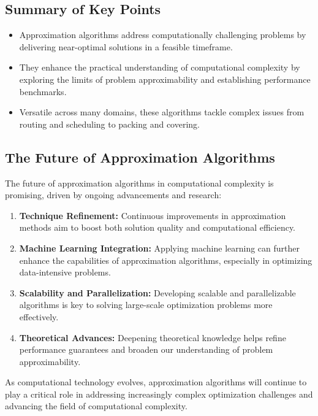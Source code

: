 \documentclass[12pt]{book} %
\begin{document}
\subsection{Summary of Key Points}

\begin{itemize}
    \item Approximation algorithms address computationally challenging problems by delivering near-optimal solutions in a feasible timeframe.
    \item They enhance the practical understanding of computational complexity by exploring the limits of problem approximability and establishing performance benchmarks.
    \item Versatile across many domains, these algorithms tackle complex issues from routing and scheduling to packing and covering.
\end{itemize}

\subsection{The Future of Approximation Algorithms}

The future of approximation algorithms in computational complexity is promising, driven by ongoing advancements and research:

\begin{enumerate}
    \item \textbf{Technique Refinement:} Continuous improvements in approximation methods aim to boost both solution quality and computational efficiency.
    \item \textbf{Machine Learning Integration:} Applying machine learning can further enhance the capabilities of approximation algorithms, especially in optimizing data-intensive problems.
    \item \textbf{Scalability and Parallelization:} Developing scalable and parallelizable algorithms is key to solving large-scale optimization problems more effectively.
    \item \textbf{Theoretical Advances:} Deepening theoretical knowledge helps refine performance guarantees and broaden our understanding of problem approximability.
\end{enumerate}

As computational technology evolves, approximation algorithms will continue to play a critical role in addressing increasingly complex optimization challenges and advancing the field of computational complexity.
\end{document}
